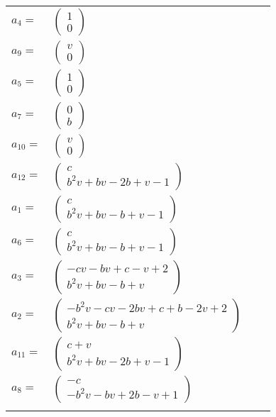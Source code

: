 \documentclass[1p]{elsarticle_modified}
\theoremstyle{definition}
\begin{document}
\begin{tabular}{m{7pt} m{180pt} m{7pt} m{180pt} }
\flushright $a_{4}=$&$\begin{pmatrix}1\\0\end{pmatrix}$ \\
\flushright $a_{9}=$&$\begin{pmatrix}v\\0\end{pmatrix}$ \\
\flushright $a_{5}=$&$\begin{pmatrix}1\\0\end{pmatrix}$ \\
\flushright $a_{7}=$&$\begin{pmatrix}0\\b\end{pmatrix}$ \\
\flushright $a_{10}=$&$\begin{pmatrix}v\\0\end{pmatrix}$ \\
\flushright $a_{12}=$&$\begin{pmatrix}c\\b^2 v+b v-2 b+v-1\end{pmatrix}$ \\
\flushright $a_{1}=$&$\begin{pmatrix}c\\b^2 v+b v- b+v-1\end{pmatrix}$ \\
\flushright $a_{6}=$&$\begin{pmatrix}c\\b^2 v+b v- b+v-1\end{pmatrix}$ \\
\flushright $a_{3}=$&$\begin{pmatrix}- c v- b v+c- v+2\\b^2 v+b v- b+v\end{pmatrix}$ \\
\flushright $a_{2}=$&$\begin{pmatrix}- b^2 v- c v-2 b v+c+b-2 v+2\\b^2 v+b v- b+v\end{pmatrix}$ \\
\flushright $a_{11}=$&$\begin{pmatrix}c+v\\b^2 v+b v-2 b+v-1\end{pmatrix}$ \\
\flushright $a_{8}=$&$\begin{pmatrix}- c\\- b^2 v- b v+2 b- v+1\end{pmatrix}$\\&\end{tabular}
\end{document}
